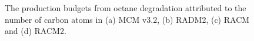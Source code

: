 
\begin{figure}[!htbp]
    \begin{center}
        \caption{The  production budgets from octane degradation attributed to the number of carbon atoms in (a) MCM v3.2, (b) RADM2, (c) RACM and (d) RACM2.}
        \label{f:octane_carbons}
    \end{center}
\end{figure} 

